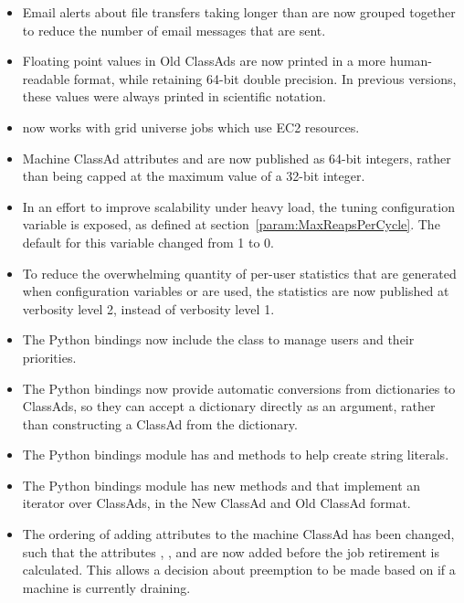 \begin{itemize}
\item Email alerts about file transfers taking longer than
 are now grouped together
to reduce the number of email messages that are sent.

\item Floating point values in Old ClassAds are now printed in a more
human-readable format, while retaining 64-bit double precision.
In previous versions, these values were always printed in scientific
notation.

\item {} now works with grid universe jobs
which use EC2 resources.

\item Machine ClassAd attributes  and  
are now published as 64-bit integers,
rather than being capped at the maximum value of a 32-bit integer.

\item In an effort to improve scalability under heavy load, the tuning
configuration variable  is exposed,
as defined at section~\ref{param:MaxReapsPerCycle}.
The default for this variable changed from 1 to 0.

\item To reduce the overwhelming quantity of per-user  
statistics that are generated when configuration variables 
 or 
 are used, 
the statistics are now published at verbosity level 2,
instead of verbosity level 1.

\item The Python bindings now include the  class to
manage users and their priorities.

\item The Python bindings now provide automatic conversions from 
dictionaries to ClassAds,
so they can accept a dictionary directly as an argument,
rather than constructing a ClassAd from the dictionary.

\item The Python bindings  module has 
 and  
methods to help create string literals. 

\item The Python bindings  module has new
methods  and  
that implement an iterator over ClassAds, in the New ClassAd and 
Old ClassAd format. 

\item The ordering of adding attributes to the machine ClassAd has been
changed, such that the attributes , ,
and  are now added before the job retirement
is calculated.
This allows a decision about preemption to be made based on if
a machine is currently draining. 

\end{itemize}

